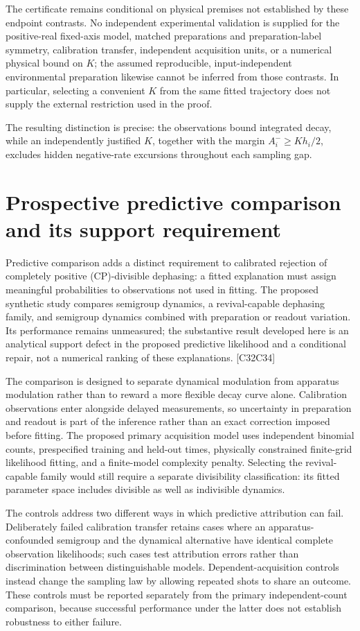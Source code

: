 \documentclass[11pt]{article}
\begin{document}
The certificate remains conditional on physical premises not established by these endpoint contrasts. No independent experimental validation is supplied for the positive-real fixed-axis model, matched preparations and preparation-label symmetry, calibration transfer, independent acquisition units, or a numerical physical bound on $K$; the assumed reproducible, input-independent environmental preparation likewise cannot be inferred from those contrasts. In particular, selecting a convenient $K$ from the same fitted trajectory does not supply the external restriction used in the proof.

The resulting distinction is precise: the observations bound integrated decay, while an independently justified $K$, together with the margin $A_i^-\geq Kh_i/2$, excludes hidden negative-rate excursions throughout each sampling gap.

\section{Prospective predictive comparison and its support requirement}
Predictive comparison adds a distinct requirement to calibrated rejection of completely positive (CP)-divisible dephasing: a fitted explanation must assign meaningful probabilities to observations not used in fitting. The proposed synthetic study compares semigroup dynamics, a revival-capable dephasing family, and semigroup dynamics combined with preparation or readout variation. Its performance remains unmeasured; the substantive result developed here is an analytical support defect in the proposed predictive likelihood and a conditional repair, not a numerical ranking of these explanations. [C32\textendash{}\allowbreak{}C34]

The comparison is designed to separate dynamical modulation from apparatus modulation rather than to reward a more flexible decay curve alone. Calibration observations enter alongside delayed measurements, so uncertainty in preparation and readout is part of the inference rather than an exact correction imposed before fitting. The proposed primary acquisition model uses independent binomial counts, prespecified training and held-out times, physically constrained finite-grid likelihood fitting, and a finite-model complexity penalty. Selecting the revival-capable family would still require a separate divisibility classification: its fitted parameter space includes divisible as well as indivisible dynamics.

The controls address two different ways in which predictive attribution can fail. Deliberately failed calibration transfer retains cases where an apparatus-confounded semigroup and the dynamical alternative have identical complete observation likelihoods; such cases test attribution errors rather than discrimination between distinguishable models. Dependent-acquisition controls instead change the sampling law by allowing repeated shots to share an outcome. These controls must be reported separately from the primary independent-count comparison, because successful performance under the latter does not establish robustness to either failure.
\end{document}
